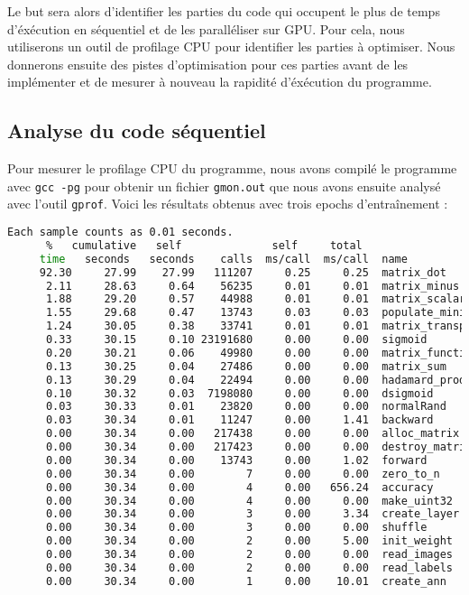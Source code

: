 \documentclass[12pt, a4paper]{article}
\begin{document}
Le but sera alors d'identifier les parties du code qui occupent le plus de temps d'éxécution en séquentiel et de les paralléliser sur GPU.
Pour cela, nous utiliserons un outil de profilage CPU pour identifier les parties à optimiser. Nous donnerons ensuite des pistes d'optimisation pour ces parties avant de les implémenter et de mesurer à nouveau la rapidité d'éxécution du programme.


\subsection{Analyse du code séquentiel}

Pour mesurer le profilage CPU du programme, nous avons compilé le programme avec \texttt{gcc -pg} pour obtenir un fichier \texttt{gmon.out} que nous avons ensuite analysé avec l'outil \texttt{gprof}. Voici les résultats obtenus avec trois epochs d'entraînement :

\begin{lstlisting}[language=bash, caption={Sortie de \texttt{gprof}}, label={lst:gprof}, ]
    Each sample counts as 0.01 seconds.
      %   cumulative   self              self     total           
     time   seconds   seconds    calls  ms/call  ms/call  name    
     92.30     27.99    27.99   111207     0.25     0.25  matrix_dot
      2.11     28.63     0.64    56235     0.01     0.01  matrix_minus
      1.88     29.20     0.57    44988     0.01     0.01  matrix_scalar
      1.55     29.68     0.47    13743     0.03     0.03  populate_minibatch
      1.24     30.05     0.38    33741     0.01     0.01  matrix_transpose
      0.33     30.15     0.10 23191680     0.00     0.00  sigmoid
      0.20     30.21     0.06    49980     0.00     0.00  matrix_function
      0.13     30.25     0.04    27486     0.00     0.00  matrix_sum
      0.13     30.29     0.04    22494     0.00     0.00  hadamard_product
      0.10     30.32     0.03  7198080     0.00     0.00  dsigmoid
      0.03     30.33     0.01    23820     0.00     0.00  normalRand
      0.03     30.34     0.01    11247     0.00     1.41  backward
      0.00     30.34     0.00   217438     0.00     0.00  alloc_matrix
      0.00     30.34     0.00   217423     0.00     0.00  destroy_matrix
      0.00     30.34     0.00    13743     0.00     1.02  forward
      0.00     30.34     0.00        7     0.00     0.00  zero_to_n
      0.00     30.34     0.00        4     0.00   656.24  accuracy
      0.00     30.34     0.00        4     0.00     0.00  make_uint32
      0.00     30.34     0.00        3     0.00     3.34  create_layer
      0.00     30.34     0.00        3     0.00     0.00  shuffle
      0.00     30.34     0.00        2     0.00     5.00  init_weight
      0.00     30.34     0.00        2     0.00     0.00  read_images
      0.00     30.34     0.00        2     0.00     0.00  read_labels
      0.00     30.34     0.00        1     0.00    10.01  create_ann
\end{lstlisting}
\end{document}

